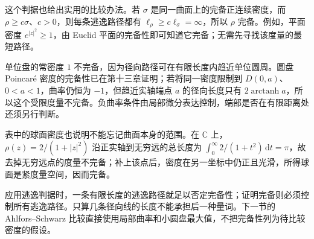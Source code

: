 这个判据也给出实用的比较办法。若 \(\sigma\) 是同一曲面上的完备正连续密度，而 \(\rho\ge c\sigma\)、\(c>0\)，则每条逃逸路径都有
\(\ell_\rho\ge c\ell_\sigma=\infty\)，所以 \(\rho\) 完备。例如，平面密度 \(e^{|z|^2}\ge1\)，由 Euclid 平面的完备性即可知道它完备；无需先寻找该度量的最短路径。

\ProseParagraphBreak
单位盘的常密度 \(1\) 不完备，因为径向路径可在有限长度内趋近单位圆周。圆盘 Poincaré 密度的完备性已在第十三章证明；若将同一密度限制到 \(D(0,a)\)、\(0<a<1\)，曲率仍恒为 \(-1\)，但趋近实轴端点 \(a\) 的径向长度只有 \(2\operatorname{arctanh}a\)，所以这个受限度量不完备。负曲率条件由局部微分表达控制，端部是否在有限距离处还须另行判断。

\ProseParagraphBreak
表中的球面密度也说明不能忘记曲面本身的范围。在 \(\mathbb C\) 上，\(\rho(z)=2/(1+|z|^2)\) 沿正实轴到无穷远的总长度为 \(\int_0^\infty2/(1+t^2)\,\mathrm dt=\pi\)，故去掉无穷远点的度量不完备；补上该点后，密度在另一坐标中仍正且光滑，所得球面是紧度量空间，因而完备。

\ProseParagraphBreak
应用逃逸判据时，一条有限长度的逃逸路径就足以否定完备性；证明完备则必须控制所有逃逸路径。只算几条径向线的长度不能承担后一种量词。下一节的 Ahlfors--Schwarz 比较直接使用局部曲率和小圆盘最大值，不把完备性列为待比较密度的假设。
